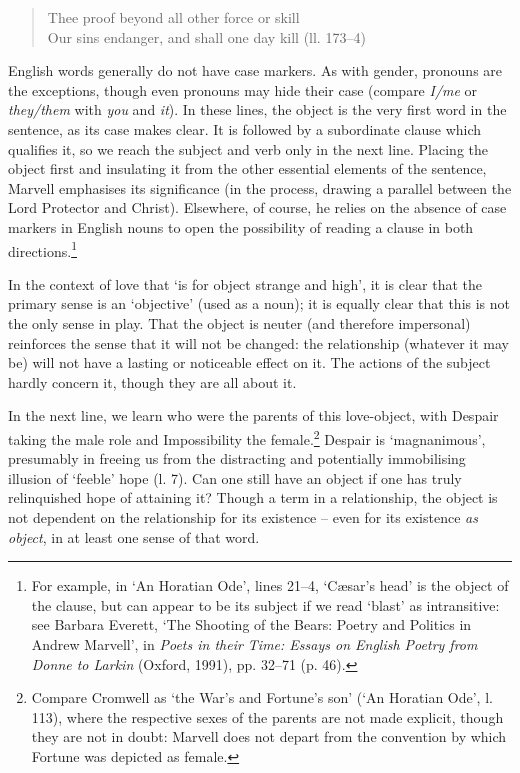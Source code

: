 ﻿\documentclass[12pt]{article}
\newcommand{\citedtitle}[1]{\textit{#1}}
\begin{document}
\begin{verse}
Thee proof beyond all other force or skill\\
Our sins endanger, and shall one day kill (ll. 173–4)
\end{verse}
English words generally do not have case markers. As with gender, pronouns are the
exceptions, though even pronouns may hide their case (compare \emph{I/me} or \emph{they/them} with \emph{you} and \emph{it}). In these lines, the
object is the very first word in the sentence, as its case makes clear. It is
followed by a subordinate clause which qualifies it, so we reach the subject
and verb only in the next line. Placing the object first and insulating it from
the other essential elements of the sentence, Marvell emphasises its
significance (in the process, drawing a parallel between the Lord Protector and
Christ). Elsewhere, of course, he relies on the absence of case markers in
English nouns to open the possibility of reading a clause in both directions.\footnote{For example, in ‘An
Horatian Ode’, lines 21–4, ‘Cæsar’s head’ is the object of the clause, but can
appear to be its subject if we read ‘blast’ as intransitive: see Barbara
Everett, ‘The Shooting of the Bears: Poetry and Politics in Andrew Marvell’, in
\citedtitle{Poets in their Time: Essays on English Poetry from Donne to Larkin} (Oxford, 1991), pp. 32–71
(p. 46).}

In
the context of love that ‘is for object strange and high’, it is clear that the
primary sense is an ‘objective’ (used as a noun); it is equally clear that this
is not the only sense in play. That the object is neuter (and therefore
impersonal) reinforces the sense that it will not be changed: the relationship
(whatever it may be) will not have a lasting or noticeable effect on it. The
actions of the subject hardly concern it, though they are all about it.

In the next line, we learn who were the parents of this love-object, with Despair
taking the male role and Impossibility the female.\footnote{Compare Cromwell as
‘the War’s and Fortune’s son’ (‘An Horatian Ode’, l. 113), where the respective
sexes of the parents are not made explicit, though they are not in doubt:
Marvell does not depart from the convention by which Fortune was depicted as
female.} Despair
is ‘magnanimous’, presumably in freeing us from the distracting and potentially
immobilising illusion of ‘feeble’ hope (l. 7). Can one still have an object if
one has truly relinquished hope of attaining it? Though a term in a
relationship, the object is not dependent on the relationship for its existence
– even for its existence \emph{as object}, in at least one sense of that
word.
\end{document}
